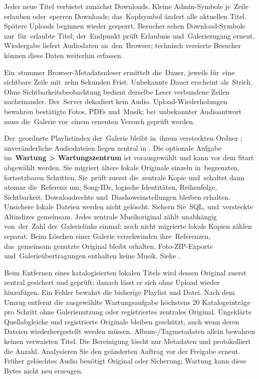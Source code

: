 \documentclass[11pt,a4paper]{article}
\newcommand{\filepath}[1]{\path{#1}}
\newcommand{\ui}[1]{\textbf{#1}}
\begin{document}
Jeder neue Titel verbietet zunächst Downloads. Kleine Admin-Symbole je~Zeile
erlauben oder~sperren Downloads; das~Kopfsymbol ändert alle aktuellen Titel.
Spätere Uploads beginnen wieder gesperrt. Besucher sehen Download-Symbole
nur~für~erlaubte Titel; der~Endpunkt prüft Erlaubnis und~Galeriezugang erneut.
Wiedergabe liefert Audiodaten an~den~Browser; technisch versierte Besucher
können diese Daten weiterhin erfassen.

Ein~stummer Browser-Metadatenleser ermittelt die~Dauer, jeweils für~eine
sichtbare Zeile mit~zehn Sekunden Frist. Unbekannte Dauer erscheint als~Strich.
Ohne Sichtbarkeitsbeobachtung bedient derselbe Leser verbundene Zeilen
nacheinander. Der~Server dekodiert kein Audio. Upload-Wiederholungen bewahren
bestätigte Fotos, PDFs und~Musik; bei~unbekannter Audioantwort muss die~Galerie
vor~einem erneuten Versuch geprüft werden.

Der~geordnete Playlistindex der~Galerie bleibt in~ihrem versteckten Ordner
\filepath{.gallery-music/}; unveränderliche Audiodateien liegen zentral in
\filepath{data/music/}. Die optionale Aufgabe im~\ui{Wartung > Wartungszentrum}
ist vorausgewählt und kann vor dem Start abgewählt werden. Sie migriert ältere
lokale Originale einzeln in~begrenzten, fortsetzbaren Schritten.
Sie~prüft zuerst die~zentrale Kopie und~schaltet dann atomar die~Referenz um;
Song-IDs, logische Identitäten, Reihenfolge, Sichtbarkeit, Downloadrechte
und~Diashoweinstellungen bleiben erhalten. Unsichere lokale Dateien werden
nicht gelöscht. Sichern Sie~SQL, \filepath{data/music/} und~versteckte
Altindizes gemeinsam. Jedes zentrale
Musikoriginal zählt unabhängig von~der~Zahl der~Galerielinks einmal; noch nicht
migrierte lokale Kopien zählen separat. Beim Löschen einer Galerie verschwinden
ihre~Referenzen, das~gemeinsam genutzte Original bleibt erhalten.
Foto-ZIP-Exporte
und~Galerieübertragungen enthalten keine Musik. Siehe
\filepath{docs/GALLERY_MUSIC.md}.

Beim Entfernen eines katalogisierten lokalen Titels wird dessen Original
zuerst zentral gesichert und geprüft; danach lässt er sich ohne Upload wieder
hinzufügen. Ein Fehler bewahrt die bisherige Playlist und Datei. Nach dem
Umzug entfernt die ausgewählte Wartungsaufgabe höchstens 20 Katalogeinträge
pro Schritt ohne Galerienutzung oder registriertes zentrales Original.
Ungeklärte Quellabgleiche und registrierte Originale bleiben geschützt, auch
wenn deren Dateien wiederhergestellt werden müssen. Album-/Tagmetadaten allein
bewahren keinen verwaisten Titel. Die Bereinigung löscht nur Metadaten und
protokolliert die Anzahl. Analysieren Sie den geänderten Auftrag vor der
Freigabe erneut. Früher gelöschtes Audio benötigt Original oder Sicherung;
Wartung kann diese Bytes nicht neu erzeugen.
\end{document}
